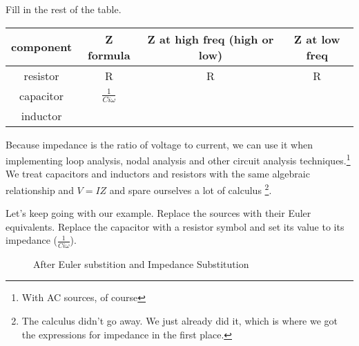\begin{clevel}
Fill in the rest of the table.
\end{clevel}

\begin{table}[H]
\begin{tabular}{|c|c|c|c|} \hline
component&Z formula&Z at high freq (high or low)& Z at low freq\\ \hline
resistor&R&R&R \\ \hline
capacitor&$\frac{1}{Ci\omega}$&& \\ \hline
inductor&&&  \\ \hline
\end{tabular}
\end{table}

Because impedance is the ratio of voltage to current, we can use it when implementing loop analysis, nodal analysis and other circuit analysis techniques.\footnote{With AC sources, of course} We treat capacitors and inductors and resistors with the same algebraic relationship and $V=IZ$ and spare ourselves a lot of calculus \footnote{The calculus didn't go away. We just already did it, which is where we got the expressions for impedance in the first place.}.\par

Let's keep going with our example. Replace the sources with their Euler equivalents. Replace the capacitor with a resistor symbol and set its value to its impedance ($\frac{1}{Ci\omega}$).

\par
\begin{figure}[H]
\begin{center}
\caption{After Euler substition and Impedance Substitution}
\label{F:8SI2}
\end{center}
\end{figure}

